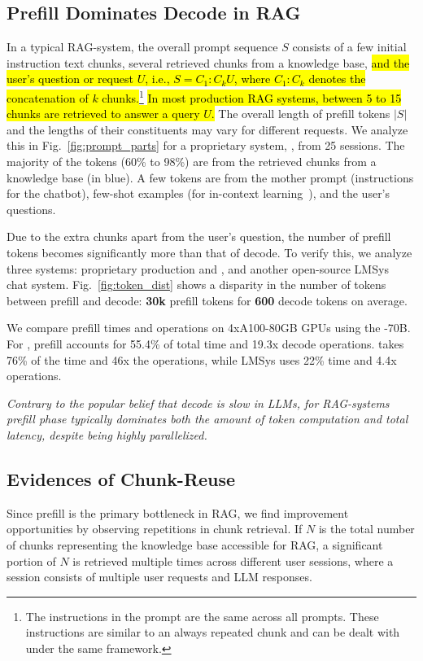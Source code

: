 \subsection{Prefill Dominates Decode in RAG}\label{sec:prefill_vs_decode}
In a typical RAG-system, the overall prompt sequence $S$ consists of a few initial instruction text chunks, several retrieved chunks from a knowledge base, \hl{and the user's question or request $U$, i.e., ${S= C_1:C_kU}$, where $C_1:C_k$ denotes the concatenation of $k$ chunks.}\footnote{The instructions in the prompt are the same across all prompts. These instructions are similar to an always repeated chunk and can be dealt with under the same framework.}
\hl{In most production RAG systems, between 5 to 15 chunks are retrieved to answer a query $U$.} 
The overall length of prefill tokens $|S|$ and the lengths of their constituents may vary for different requests. 
We analyze this in Fig.~\ref{fig:prompt_parts} for a proprietary system, \X, from 25 sessions. The majority of the tokens (60\% to 98\%) are from the retrieved chunks from a knowledge base (in blue). A few tokens are from the mother prompt (instructions for the chatbot), few-shot examples (for in-context learning~\cite{dong2022survey}), and the user's questions.  

Due to the extra chunks apart from the user's question, the number of prefill tokens becomes significantly more than that of decode. To verify this, we analyze three systems: proprietary production \X and \Y, and another open-source LMSys~\cite{zheng2023lmsys} chat system. 
Fig.~\ref{fig:token_dist} shows a disparity in the number of tokens between prefill and decode: \textbf{30k} prefill tokens for \textbf{600} decode tokens on average.


We compare prefill times and operations on 4xA100-80GB GPUs using the \llama-70B. For \X, prefill accounts for 55.4\% of total time and 19.3x decode operations. \Y takes 76\% of the time and 46x the operations, while LMSys uses 22\% time and 4.4x operations. 

\textit{Contrary to the popular belief that decode is slow in LLMs, for RAG-systems prefill phase typically dominates both the amount of token computation and total latency, despite being highly parallelized.} 



\subsection{Evidences of Chunk-Reuse}\label{sec:chunk_reuse}
Since prefill is the primary bottleneck in RAG, we find improvement opportunities by observing repetitions in chunk retrieval. If $N$ is the total number of chunks representing the knowledge base accessible for RAG, a significant portion of $N$ is retrieved multiple times across different user sessions, where a session consists of multiple user requests and LLM responses. 



